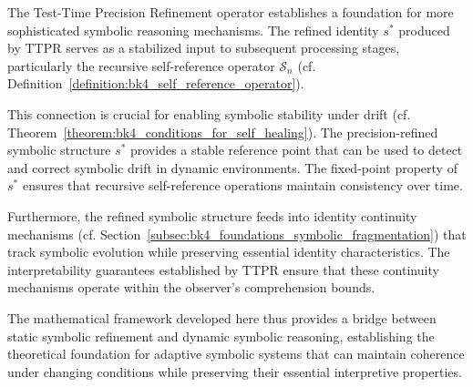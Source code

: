 \begin{remark}
\label{bridge:bk4_ttpr_to_self_reference}
The Test-Time Precision Refinement operator establishes a foundation for more sophisticated symbolic reasoning mechanisms. The refined identity $s^*$ produced by TTPR serves as a stabilized input to subsequent processing stages, particularly the recursive self-reference operator $\mathcal{S}_n$ (cf. Definition~\ref{definition:bk4_self_reference_operator}).

This connection is crucial for enabling symbolic stability under drift (cf. Theorem~\ref{theorem:bk4_conditions_for_self_healing}). The precision-refined symbolic structure $s^*$ provides a stable reference point that can be used to detect and correct symbolic drift in dynamic environments. The fixed-point property of $s^*$ ensures that recursive self-reference operations maintain consistency over time.

Furthermore, the refined symbolic structure feeds into identity continuity mechanisms (cf. Section~\ref{subsec:bk4_foundations_symbolic_fragmentation}) that track symbolic evolution while preserving essential identity characteristics. The interpretability guarantees established by TTPR ensure that these continuity mechanisms operate within the observer's comprehension bounds.

The mathematical framework developed here thus provides a bridge between static symbolic refinement and dynamic symbolic reasoning, establishing the theoretical foundation for adaptive symbolic systems that can maintain coherence under changing conditions while preserving their essential interpretive properties.
\end{remark}


